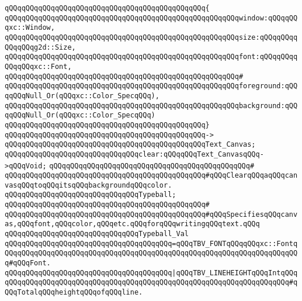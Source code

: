 \verb|qQQqqQQqqQQqqQQqqQQqqQQqqQQqqQQqqQQqqQQqqQQqqQQq{|\newline
\verb|qQQqqQQqqQQqqQQqqQQqqQQqqQQqqQQqqQQqqQQqqQQqqQQqqQQqqQQqwindow:qQQqqQQqxc::Window,|\newline
\verb|qQQqqQQqqQQqqQQqqQQqqQQqqQQqqQQqqQQqqQQqqQQqqQQqqQQqqQQqsize:qQQqqQQqqQQqqQQqg2d::Size,|\newline
\verb|qQQqqQQqqQQqqQQqqQQqqQQqqQQqqQQqqQQqqQQqqQQqqQQqqQQqqQQqfont:qQQqqQQqqQQqqQQqxc::Font,|\newline
\verb|qQQqqQQqqQQqqQQqqQQqqQQqqQQqqQQqqQQqqQQqqQQqqQQqqQQqqQQq#|\newline
\verb|qQQqqQQqqQQqqQQqqQQqqQQqqQQqqQQqqQQqqQQqqQQqqQQqqQQqqQQqforeground:qQQqqQQqNull_Or(qQQqxc::Color_SpecqQQq),|\newline
\verb|qQQqqQQqqQQqqQQqqQQqqQQqqQQqqQQqqQQqqQQqqQQqqQQqqQQqqQQqbackground:qQQqqQQqNull_Or(qQQqxc::Color_SpecqQQq)|\newline
\verb|qQQqqQQqqQQqqQQqqQQqqQQqqQQqqQQqqQQqqQQqqQQqqQQq}|\newline
\verb|qQQqqQQqqQQqqQQqqQQqqQQqqQQqqQQqqQQqqQQqqQQqqQQq->|\newline
\verb|qQQqqQQqqQQqqQQqqQQqqQQqqQQqqQQqqQQqqQQqqQQqqQQqText_Canvas;|\newline
\newline
\verb|qQQqqQQqqQQqqQQqqQQqqQQqqQQqqQQqclear:qQQqqQQqText_CanvasqQQq->qQQqVoid;|\newline
\verb|qQQqqQQqqQQqqQQqqQQqqQQqqQQqqQQqqQQqqQQqqQQqqQQq#|\newline
\verb|qQQqqQQqqQQqqQQqqQQqqQQqqQQqqQQqqQQqqQQqqQQqqQQq#qQQqClearqQQqaqQQqcanvasqQQqtoqQQqitsqQQqbackgroundqQQqcolor.|\newline
\newline
\verb|qQQqqQQqqQQqqQQqqQQqqQQqqQQqqQQqTypeball;|\newline
\verb|qQQqqQQqqQQqqQQqqQQqqQQqqQQqqQQqqQQqqQQqqQQqqQQq#|\newline
\verb|qQQqqQQqqQQqqQQqqQQqqQQqqQQqqQQqqQQqqQQqqQQqqQQq#qQQqSpecifiesqQQqcanvas,qQQqfont,qQQqcolor,qQQqetc.qQQqforqQQqwritingqQQqtext.qQQq|\newline
\newline
\verb|qQQqqQQqqQQqqQQqqQQqqQQqqQQqqQQqTypeball_Val|\newline
\verb|qQQqqQQqqQQqqQQqqQQqqQQqqQQqqQQqqQQqqQQq=qQQqTBV_FONTqQQqqQQqxc::FontqQQqqQQqqQQqqQQqqQQqqQQqqQQqqQQqqQQqqQQqqQQqqQQqqQQqqQQqqQQqqQQqqQQqqQQq#qQQqFont.|\newline
\verb|qQQqqQQqqQQqqQQqqQQqqQQqqQQqqQQqqQQqqQQq|\verb#|qQQqTBV_LINEHEIGHTqQQqIntqQQqqQQqqQQqqQQqqQQqqQQqqQQqqQQqqQQqqQQqqQQqqQQqqQQqqQQqqQQqqQQqqQQqqQQq#\verb|#qQQqTotalqQQqheightqQQqofqQQqline.|\newline

